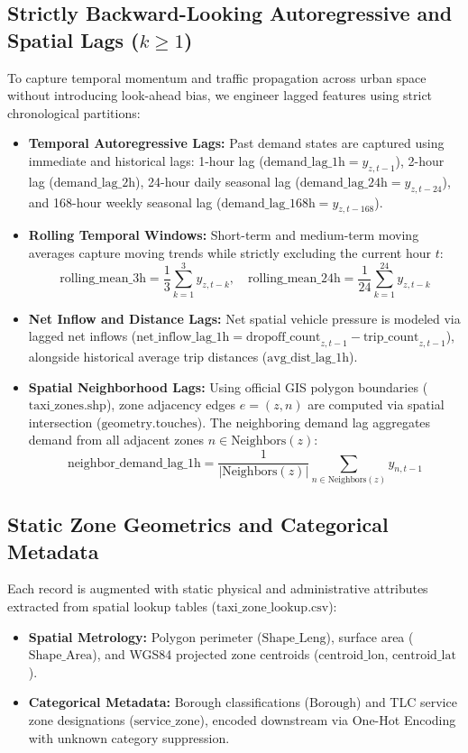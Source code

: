 \documentclass[11pt,a4paper]{article}
\begin{document}
\subsection{Strictly Backward-Looking Autoregressive and Spatial Lags ($k \ge 1$)}
To capture temporal momentum and traffic propagation across urban space without introducing look-ahead bias, we engineer lagged features using strict chronological partitions:
\begin{itemize}
    \item \textbf{Temporal Autoregressive Lags:} Past demand states are captured using immediate and historical lags: 1-hour lag ($\text{demand\_lag\_1h} = y_{z, t-1}$), 2-hour lag ($\text{demand\_lag\_2h}$), 24-hour daily seasonal lag ($\text{demand\_lag\_24h} = y_{z, t-24}$), and 168-hour weekly seasonal lag ($\text{demand\_lag\_168h} = y_{z, t-168}$).
    \item \textbf{Rolling Temporal Windows:} Short-term and medium-term moving averages capture moving trends while strictly excluding the current hour $t$:
    \begin{equation}
    \text{rolling\_mean\_3h} = \frac{1}{3}\sum_{k=1}^{3} y_{z, t-k}, \quad \text{rolling\_mean\_24h} = \frac{1}{24}\sum_{k=1}^{24} y_{z, t-k}
    \end{equation}
    \item \textbf{Net Inflow and Distance Lags:} Net spatial vehicle pressure is modeled via lagged net inflows ($\text{net\_inflow\_lag\_1h} = \text{dropoff\_count}_{z, t-1} - \text{trip\_count}_{z, t-1}$), alongside historical average trip distances ($\text{avg\_dist\_lag\_1h}$).
    \item \textbf{Spatial Neighborhood Lags:} Using official GIS polygon boundaries ($\text{taxi\_zones.shp}$), zone adjacency edges $e = (z, n)$ are computed via spatial intersection ($\text{geometry.touches}$). The neighboring demand lag aggregates demand from all adjacent zones $n \in \text{Neighbors}(z)$:
    \begin{equation}
    \text{neighbor\_demand\_lag\_1h} = \frac{1}{|\text{Neighbors}(z)|} \sum_{n \in \text{Neighbors}(z)} y_{n, t-1}
    \end{equation}
\end{itemize}

\subsection{Static Zone Geometrics and Categorical Metadata}
Each record is augmented with static physical and administrative attributes extracted from spatial lookup tables ($\text{taxi\_zone\_lookup.csv}$):
\begin{itemize}
    \item \textbf{Spatial Metrology:} Polygon perimeter ($\text{Shape\_Leng}$), surface area ($\text{Shape\_Area}$), and WGS84 projected zone centroids ($\text{centroid\_lon}$, $\text{centroid\_lat}$).
    \item \textbf{Categorical Metadata:} Borough classifications ($\text{Borough}$) and TLC service zone designations ($\text{service\_zone}$), encoded downstream via One-Hot Encoding with unknown category suppression.
\end{itemize}
\end{document}
